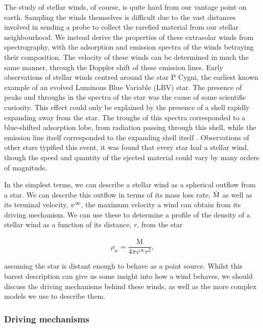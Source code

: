 The study of stellar winds, of course, is quite hard from our vantage point on earth.
Sampling the winds themselves is difficult due to the vast distances involved in sending a probe to collect the rarefied material from our stellar neighbourhood.
We instead derive the properties of these extrasolar winds from spectrography, with the adsorption and emission spectra of the winds betraying their composition.
The velocity of these winds can be determined in much the same manner, through the Doppler shift of these emission lines.
Early observations of stellar winds centred around the star P Cygni, the earliest known example of an evolved Luminous Blue Variable (LBV) star.
The presence of peaks and throughs in the spectra of the star was the cause of some scientific curiosity.
This effect could only be explained by the presence of a shell rapidly expanding away from the star.
The troughs of this spectra corresponded to a blue-shifted adsorption lobe, from radiation passing through this shell, while the emission line itself corresponded to the expanding shell itself \parencite{bealsNatureWolfRayetEmission1929,lamersIntroductionStellarWinds1999}.
Observations of other stars typified this event, it was found that every star had a stellar wind, though the speed and quantity of the ejected material could vary by many orders of magnitude.

In the simplest terms, we can describe a stellar wind as a spherical outflow from a star.
We can describe this outflow in terms of its mass loss rate, $\dot{\text{M}}$ as well as its terminal velocity, $v^\infty$, the maximum velocity a wind can obtain from its driving mechanism.
We can use these to determine a profile of the density of a stellar wind as a function of its distance, $r$, from the star

\begin{equation}
  \rho_w = \frac{\dot{\text{M}}}{4 \pi v^\infty r^2}, \label{eq:smoothwind}
\end{equation}

\noindent
assuming the star is distant enough to behave as a point source.
Whilst this barest description can give us some insight into how a wind behaves, we should discuss the driving mechanisms behind these winds, as well as the more complex models we use to describe them.

\subsubsection{Driving mechanisms}

